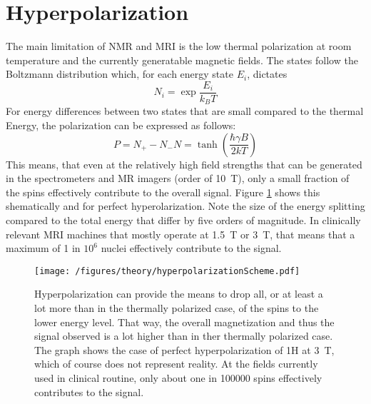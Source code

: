     \section{Hyperpolarization}
        The main limitation of NMR and MRI is the low thermal polarization at room temperature and the currently generatable magnetic fields. The states follow the Boltzmann distribution \cite{canet_para-hydrogen_2006} which, for each energy state $E_i$, dictates
        \begin{equation}
            N_i = \exp{\frac{E_i}{k_B T}}
        \end{equation}
        For energy differences between two states that are small compared to the thermal Energy, the polarization can be expressed as follows:
        \begin{equation}
            P = {N_+-N_-}{N} = \tanh\left(\frac{\hbar \gamma B}{2 k T }\right)
            \label{equation:theory:polarization}
        \end{equation}
        This means, that even at the relatively high field strengths that can be generated in the spectrometers and MR imagers (order of \SI{10}{\tesla}), only a small fraction of the spins effectively contribute to the overall signal. Figure \ref{figure:theory:boltzmannDistribution} shows this shematically and for perfect hyperolarization. Note the size of the energy splitting compared to the total energy that differ by five orders of magnitude. In clinically relevant MRI machines that mostly operate at \SI{1.5}{\tesla} or \SI{3}{\tesla}, that means that a maximum of 1 in $10^6$ nuclei effectively contribute to the signal.
        \begin{figure}
            \centering
            \texttt{[image: /figures/theory/hyperpolarizationScheme.pdf]}
            \caption[Hyperpolarization scheme]{Hyperpolarization can provide the means to drop all, or at least a lot more than in the thermally polarized case, of the spins to the lower energy level. That way, the overall magnetization and thus the signal observed is a lot higher than in ther thermally polarized case. The graph shows the case of perfect hyperpolarization of 1H at \SI{3}{\tesla}, which of course does not represent reality. At the fields currently used in clinical routine, only about one in 100000 spins effectively contributes to the signal.}
            \label{figure:theory:boltzmannDistribution}
        \end{figure}

